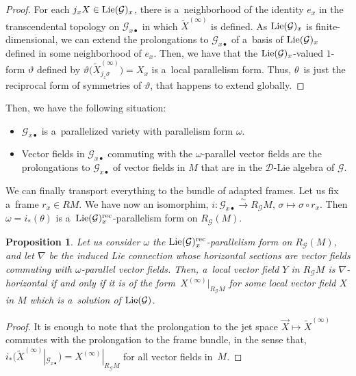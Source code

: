\documentclass[10pt,a4paper]{amsart}
\numberwithin{equation}{section}
\newtheorem{Proposition}[Theorem]{Proposition}
\theoremstyle{definition}
\begin{document}
\begin{proof}
For each $j_x X\in {\rm Lie}(\mathcal G)_x$, there is a~neighborhood of the identity $e_{x}$ in the transcendental topology on $\mathcal G_{x\bullet}$ in which $\widetilde X^{(\infty)}$ is defined. As ${\rm Lie}(\mathcal G)_x$ is finite-dimensional, we can extend the prolongations to $\mathcal G_{x\bullet}$ of a~basis of
${\rm Lie}(\mathcal G)_x$ defined in some neighborhood of $e_x$. Then, we have that the ${\rm Lie}(\mathcal G)_x$-valued $1$-form $\vartheta$ defined by $\vartheta\bigl(\widetilde X^{(\infty)}_{j_z\sigma}\bigr) = X_x$ is a~local parallelism form. Thus, $\theta$~is just the reciprocal form of symmetries of $\vartheta$, that happens to extend globally.
\end{proof}

Then, we have the following situation:
\begin{itemize}\itemsep=0pt
\item[(a)] $\mathcal G_{x\bullet}$ is a~parallelized variety with parallelism form $\omega$.
\item[(b)] Vector fields in $\mathcal G_{x\bullet}$ commuting with the $\omega$-parallel vector fields are the prolongations to $\mathcal G_{x\bullet}$ of vector fields in $M$ that are in the $\mathcal D$-Lie algebra of $\mathcal G$.
\end{itemize}

We can finally transport everything to the bundle of adapted frames. Let us fix a~frame $r_x\in RM$. We have now an isomorphim,
$i\colon \mathcal G_{x\bullet} \xrightarrow{\sim} R_{\mathcal G}M$, $ \sigma \mapsto \sigma\circ r_x$.
Then $\omega = i_*(\theta)$ is a~${\rm Lie}(\mathcal G)_x^{\rm rec}$-parallelism form on $R_{\mathcal G}(M)$.

\begin{Proposition}
 Let us consider $\omega$ the ${\rm Lie}(\mathcal G)_x^{\rm rec}$-parallelism form on $R_{\mathcal G}(M)$, and
let $\nabla$ be the induced Lie connection whose horizontal sections are vector fields commuting with $\omega$-parallel vector fields. Then, a~local vector field $Y$ in $R_\mathcal GM$ is $\nabla$-horizontal if and only if it is of the form~$X^{(\infty)}|_{R_\mathcal GM}$ for some local vector field $X$ in $M$ which is a~solution of ${\rm Lie}(\mathcal G)$.
\end{Proposition}

\begin{proof}
It is enough to note that the prolongation to the jet space $\vec X\mapsto \widetilde X^{(\infty)}$ commutes with the prolongation to the frame bundle, in the sense that, $i_*\bigl(\widetilde X^{(\infty)}|_{\mathcal G_{x\bullet}}\bigr) = X^{(\infty)}|_{R_\mathcal GM}$ for all vector fields in~$M$.
\end{proof}
\end{document}
